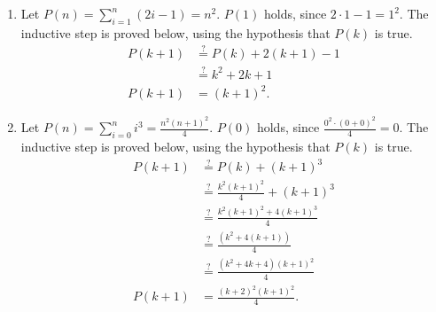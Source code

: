 \documentclass[12pt]{article}
\newcommand{\posseq}{\stackrel{?}{=}}
\begin{document}
\begin{enumerate}
\begin{enumerate}
    \item Let $P(n) = \sum_{i = 1}^{n} (2i - 1) = n^{2}$. $P(1)$ holds, since $2 \cdot 1 - 1 = 1^{2}$. The inductive step is proved below, using the hypothesis that $P(k)$ is true.
    \begin{align*}
      P(k + 1) & \posseq P(k) + 2(k + 1) - 1  \\
               & \posseq k^{2} + 2k + 1       \\
      P(k + 1) & = (k + 1)^{2}.
    \end{align*}
    
    \item Let $P(n) = \sum_{i = 0}^{n} i^{3} = \frac{n^{2} (n + 1)^{2}}{4}$. $P(0)$ holds, since $\tfrac{0^{2} \cdot (0 + 0)^{2}}{4} = 0$. The inductive step is proved below, using the hypothesis that $P(k)$ is true.
    \begin{align*}
      P(k + 1) & \posseq P(k) + (k + 1)^{3}                         \\
               & \posseq \frac{k^{2} (k + 1)^{2}}{4} + (k + 1)^{3}  \\
               & \posseq \frac{k^{2} (k + 1)^{2} + 4(k + 1)^{3}}{4} \\
               & \posseq \frac{(k^{2} + 4(k + 1))}{4}    \\
               & \posseq \frac{(k^{2} + 4k + 4)(k + 1)^{2}}{4}      \\
      P(k + 1) & = \frac{(k + 2)^{2}(k + 1)^{2}}{4}.
    \end{align*}
  \end{enumerate}
  

\end{enumerate}
\end{document}

